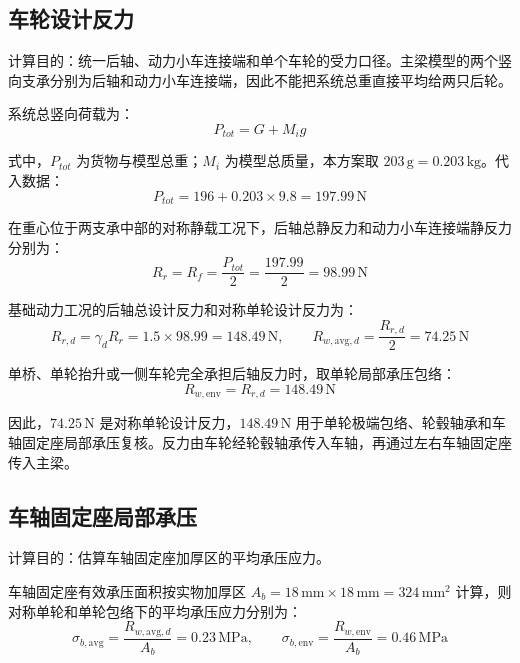 \documentclass[UTF8,a4paper,12pt,fontset=none]{ctexart}
\numberwithin{equation}{section}
\numberwithin{figure}{section}
\numberwithin{table}{section}
\newcommand{\mm}{\,\mathrm{mm}}
\newcommand{\g}{\,\mathrm{g}}
\newcommand{\kg}{\,\mathrm{kg}}
\newcommand{\Nunit}{\,\mathrm{N}}
\newcommand{\MPa}{\,\mathrm{MPa}}
\begin{document}
\subsection{车轮设计反力}
计算目的：统一后轴、动力小车连接端和单个车轮的受力口径。主梁模型的两个竖向支承分别为后轴和动力小车连接端，因此不能把系统总重直接平均给两只后轮。

系统总竖向荷载为：
\begin{equation}
  P_{tot}=G+M_i g
\end{equation}

式中，$P_{tot}$ 为货物与模型总重；$M_i$ 为模型总质量，本方案取 $203\g=0.203\kg$。代入数据：
\begin{equation}
  P_{tot}=196+0.203\times9.8=197.99\Nunit
\end{equation}

在重心位于两支承中部的对称静载工况下，后轴总静反力和动力小车连接端静反力分别为：
\begin{equation}
  R_{r}=R_{f}=\frac{P_{tot}}{2}=\frac{197.99}{2}=98.99\Nunit
\end{equation}

基础动力工况的后轴总设计反力和对称单轮设计反力为：
\begin{equation}
  R_{r,d}=\gamma_dR_r=1.5\times98.99=148.49\Nunit,
  \qquad R_{w,\mathrm{avg},d}=\frac{R_{r,d}}{2}=74.25\Nunit
\end{equation}

单桥、单轮抬升或一侧车轮完全承担后轴反力时，取单轮局部承压包络：
\begin{equation}
  R_{w,\mathrm{env}}=R_{r,d}=148.49\Nunit
\end{equation}

因此，$74.25\Nunit$ 是对称单轮设计反力，$148.49\Nunit$ 用于单轮极端包络、轮毂轴承和车轴固定座局部承压复核。反力由车轮经轮毂轴承传入车轴，再通过左右车轴固定座传入主梁。

\subsection{车轴固定座局部承压}
计算目的：估算车轴固定座加厚区的平均承压应力。

车轴固定座有效承压面积按实物加厚区 $A_b=18\mm\times18\mm=324\mm^2$ 计算，则对称单轮和单轮包络下的平均承压应力分别为：
\begin{equation}
  \sigma_{b,\mathrm{avg}}=\frac{R_{w,\mathrm{avg},d}}{A_b}=0.23\MPa,
  \qquad
  \sigma_{b,\mathrm{env}}=\frac{R_{w,\mathrm{env}}}{A_b}=0.46\MPa
\end{equation}
\end{document}
